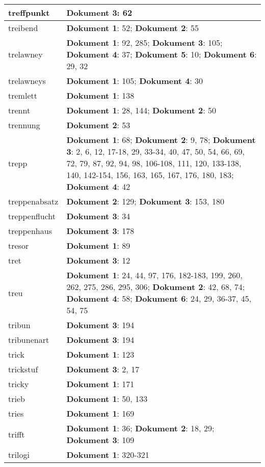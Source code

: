 \documentclass[a5paper]{article}
\begin{document}
\begin{longtable}[l]{|l|p{3in}|}
\hline
treffpunkt & \textbf{Dokument 3}: 62 \\
\hline
treibend & \textbf{Dokument 1}: 52; \textbf{Dokument 2}: 55 \\
\hline
trelawney & \textbf{Dokument 1}: 92, 285; \textbf{Dokument 3}: 105; \textbf{Dokument 4}: 37; \textbf{Dokument 5}: 10; \textbf{Dokument 6}: 29, 32 \\
\hline
trelawneys & \textbf{Dokument 1}: 105; \textbf{Dokument 4}: 30 \\
\hline
tremlett & \textbf{Dokument 1}: 138 \\
\hline
trennt & \textbf{Dokument 1}: 28, 144; \textbf{Dokument 2}: 50 \\
\hline
trennung & \textbf{Dokument 2}: 53 \\
\hline
trepp & \textbf{Dokument 1}: 68; \textbf{Dokument 2}: 9, 78; \textbf{Dokument 3}: 2, 6, 12, 17-18, 29, 33-34, 40, 47, 50, 54, 66, 69, 72, 79, 87, 92, 94, 98, 106-108, 111, 120, 133-138, 140, 142-154, 156, 163, 165, 167, 176, 180, 183; \textbf{Dokument 4}: 42 \\
\hline
treppenabsatz & \textbf{Dokument 2}: 129; \textbf{Dokument 3}: 153, 180 \\
\hline
treppenflucht & \textbf{Dokument 3}: 34 \\
\hline
treppenhaus & \textbf{Dokument 3}: 178 \\
\hline
tresor & \textbf{Dokument 1}: 89 \\
\hline
tret & \textbf{Dokument 3}: 12 \\
\hline
treu & \textbf{Dokument 1}: 24, 44, 97, 176, 182-183, 199, 260, 262, 275, 286, 295, 306; \textbf{Dokument 2}: 42, 68, 74; \textbf{Dokument 4}: 58; \textbf{Dokument 6}: 24, 29, 36-37, 45, 54, 75 \\
\hline
tribun & \textbf{Dokument 3}: 194 \\
\hline
tribunenart & \textbf{Dokument 3}: 194 \\
\hline
trick & \textbf{Dokument 1}: 123 \\
\hline
trickstuf & \textbf{Dokument 3}: 2, 17 \\
\hline
tricky & \textbf{Dokument 1}: 171 \\
\hline
trieb & \textbf{Dokument 1}: 50, 133 \\
\hline
tries & \textbf{Dokument 1}: 169 \\
\hline
trifft & \textbf{Dokument 1}: 36; \textbf{Dokument 2}: 18, 29; \textbf{Dokument 3}: 109 \\
\hline
trilogi & \textbf{Dokument 1}: 320-321 \\

\end{longtable}
\end{document}
